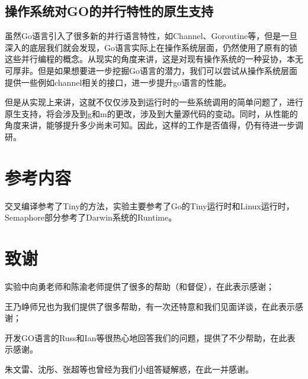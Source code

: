 \documentclass{article}
\begin{document}
\subsection{操作系统对GO的并行特性的原生支持}
虽然Go语言引入了很多新的并行语言特性，如Channel、Goroutine等，但是一旦深入的底层我们就会发现，Go语言实际上在操作系统层面，仍然使用了原有的锁这些并行编程的概念。从现实的角度来讲，这是对现有操作系统的一种妥协，本无可厚非。但是如果想要进一步挖掘Go语言的潜力，我们可以尝试从操作系统层面提供一些例如channel相关的接口，进一步提升go语言的性能。

但是从实现上来讲，这就不仅仅涉及到运行时的一些系统调用的简单问题了，进行原生支持，将会涉及到g和m的更改，涉及到大量源代码的变动。同时，从性能的角度来讲，能够提升多少尚未可知。因此，这样的工作是否值得，仍有待进一步调研。

\section{参考内容}

交叉编译参考了Tiny的方法，实验主要参考了Go的Tiny运行时和Linux运行时，Semaphore部分参考了Darwin系统的Runtime。

\section{致谢}
实验中向勇老师和陈渝老师提供了很多的帮助（和督促），在此表示感谢；

王乃峥师兄也为我们提供了很多帮助，有一次还特意和我们见面详谈，在此表示感谢；

开发GO语言的Russ和Ian等很热心地回答我们的问题，提供了不少帮助，在此表示感谢。

朱文雷、沈彤、张超等也曾经为我们小组答疑解惑，在此一并感谢。
\end{document}
